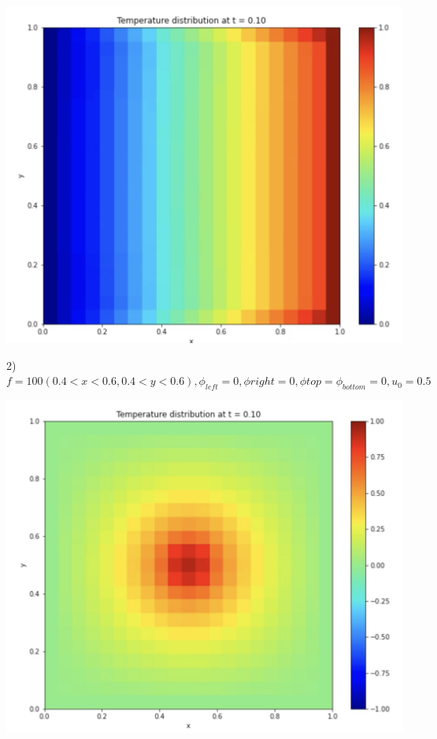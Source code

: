 \documentclass[a4paper]{article}
\begin{document}
\begin{center}
	\includegraphics[width=500pt]{linear.png}
\end{center}



2) $f = 100 (0.4 < x < 0.6, 0.4 < y < 0.6), \phi_{left} = 0, \phi{right} = 0, \phi{top} = \phi_{bottom} = 0, u_0 = 0.5$

\begin{center}
	\includegraphics[width=500pt]{center.png}
\end{center}
\end{document}
